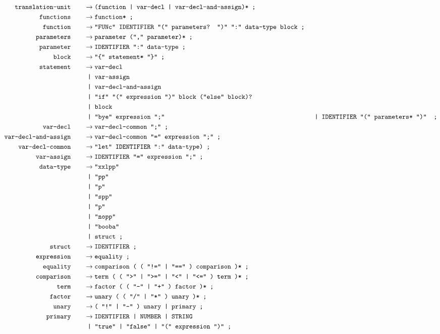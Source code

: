 \documentclass[12pt, a4paper]{article}
\newcommand{\ttt}[1]{
    \text{\texttt{#1}}
}
\newcommand{\ebnfnode}[2]{%
    #1\hspace{20px} &\to #2\ttt{ ;}\\
}
\newcommand{\ebnfnodett}[2]{%
    \ebnfnode{\ttt{#1}}{\ttt{#2}}
}
\begin{document}
    \begin{align*}
        \ebnfnodett{translation-unit}{(function | var-decl | var-decl-and-assign)*}
        \ebnfnodett{functions}{function*}
        \ebnfnodett{function}{"FUNc" IDENTIFIER "(" parameters? ")" ":" data-type block}
        \ebnfnodett{parameters}{parameter ("," parameter)*}
        \ebnfnodett{parameter}{IDENTIFIER ":" data-type}
        \ebnfnodett{block}{"\{" statement* "\}"}
        \ebnfnode{\ttt{statement}}
        {%
            \ttt{var-decl}\\
            &\ttt{ | var-assign }\\
            &\ttt{ | var-decl-and-assign }\\
            &\ttt{ | "if" "(" expression ")" block ("else" block)?}\\
            &\ttt{ | block }\\
            &\ttt{ | "bye" expression ";" }
            &\ttt{ | IDENTIFIER "(" parameters* ")" }
        }
        \ebnfnodett{var-decl}{var-decl-common ";"}
        \ebnfnodett{var-decl-and-assign}{var-decl-common "=" expression ";"}
        \ebnfnodett{var-decl-common}{"let" IDENTIFIER ":" data-type)}
        \ebnfnodett{var-assign}{IDENTIFIER "=" expression ";"}
        \ebnfnode{\ttt{data-type}}
        {%
            \ttt{"xxlpp"}\\
            &\ttt{ | "pp"}\\
            &\ttt{ | "p"}\\
            &\ttt{ | "spp"}\\
            &\ttt{ | "p"}\\
            &\ttt{ | "nopp"}\\
            &\ttt{ | "booba"}\\
            &\ttt{ | struct}
        }
        \ebnfnodett{struct}{IDENTIFIER}
        \ebnfnodett{expression}{equality}
        \ebnfnodett{equality}{comparison ( ( "!=" | "==" ) comparison )*}
        \ebnfnodett{comparison}{term ( ( ">" | ">=" | "<" | "<=" ) term )*}
        \ebnfnodett{term}{factor ( ( "-" | "+" ) factor )*}
        \ebnfnodett{factor}{unary ( ( "/" | "*" ) unary )*}
        \ebnfnodett{unary}{( "!" | "-" ) unary | primary}
        \ebnfnode{\ttt{primary}}
        {%
            \ttt{IDENTIFIER | NUMBER | STRING}\\
            &\ttt{ | "true" | "false" | "(" expression ")"}
        }
    \end{align*}
\end{document}

